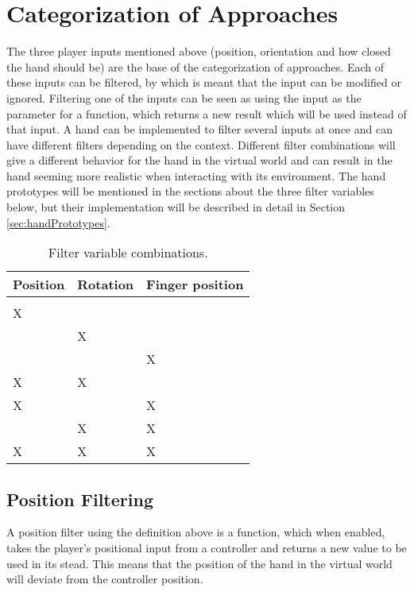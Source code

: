 \section{Categorization of Approaches}
\label{sec:categorizationOfApproaches}
The three player inputs mentioned above (position, orientation and how closed the hand should be) are the base of the categorization of approaches. Each of these inputs can be filtered, by which is meant that the input can be modified or ignored. Filtering one of the inputs can be seen as using the input as the parameter for a function, which returns a new result which will be used instead of that input. A hand can be implemented to filter several inputs at once and can have different filters depending on the context. Different filter combinations will give a different behavior for the hand in the virtual world and can result in the hand seeming more realistic when interacting with its environment. The hand prototypes will be mentioned in the sections about the three filter variables below, but their implementation will be described in detail in Section \ref{sec:handPrototypes}.

\begin{table}[H]
\centering
\caption{Filter variable combinations.}
\label{tab:filterVariableCombinations}
\begin{tabular}{C{2cm}C{2cm}C{2cm}}
Position & Rotation & Finger position \\ \midrule \midrule
				&					&					\\ \midrule
\Large X	&					&					\\ \midrule
				& \Large X	& 		                \\ \midrule
				&					& \Large X     \\ \midrule
\Large X	& \Large X	&					\\ \midrule
\Large X 	&					& \Large X	\\ \midrule
				& \Large X	& \Large X	\\ \midrule
\Large X 	& \Large X 	& \Large X
\end{tabular}
\end{table}

\subsection{Position Filtering}
\label{subsec:categoryPositionFiltering}
A position filter using the definition above is a function, which when enabled, takes the player's positional input from a controller and returns a new value to be used in its stead. This means that the position of the hand in the virtual world will deviate from the controller position.\\

